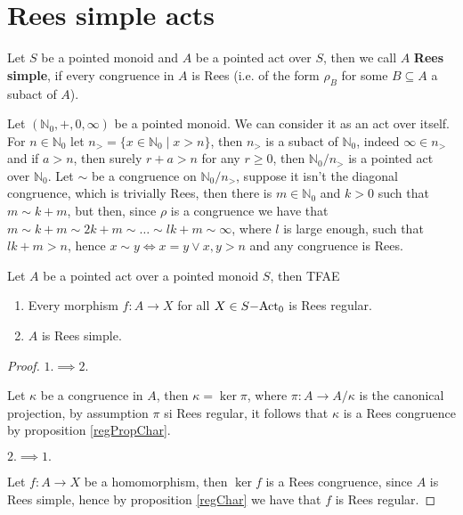 \section{Rees simple acts}
\begin{definition}
    Let $S$ be a pointed monoid and $A$ be a pointed act over $S$, then we call $A$
    \textbf{Rees simple}, if every congruence in $A$ is Rees (i.e. of the form $\rho_B$ for some $B\subseteq A$ a subact of $A$).
\end{definition}
\begin{example}
    Let $(\mathbb{N}_0, +, 0, \infty)$ be a pointed monoid. We can consider it as an act over itself. For $n\in\mathbb{N}_0$ let 
    $n_> = \{x\in\mathbb{N}_0 \mid x > n\}$, then $n_>$ is a subact of $\mathbb{N}_0$, indeed $\infty\in n_>$ and if $a > n$, then 
    surely $r+a > n$ for any $r \geq 0$, then $\mathbb{N}_0/n_>$ is a pointed act over $\mathbb{N}_0$. Let $\sim$ be a congruence on 
    $\mathbb{N}_0/n_>$, suppose it isn't the diagonal congruence, which is trivially Rees, then there is $m\in\mathbb{N}_0$ and $k>0$ such that 
    $m\sim k+m$, but then, since $\rho$ is a congruence we have that $m\sim k+m\sim 2k+m \sim\dots \sim lk+m \sim \infty$, where $l$
    is large enough, such that $lk+m > n$, hence $x\sim y \iff x=y \lor x,y > n$ and any congruence is Rees. 
\end{example}
\begin{proposition}
    Let $A$ be a pointed act over a pointed monoid $S$, then TFAE
    \begin{enumerate}
        \item Every morphism $f: A \to X$ for all $X\in S\mathrm{-Act}_0$ is Rees regular.
        \item $A$ is Rees simple.
    \end{enumerate}
\end{proposition}
\begin{proof}[Proof]
    $1. \implies 2.$\par 
    Let $\kappa$ be a congruence in $A$, then $\kappa=\ker{\pi}$, where $\pi: A \to A/\kappa$ is the canonical projection, by 
    assumption $\pi$ si Rees regular, it follows that $\kappa$ is a Rees congruence by proposition \ref{regPropChar}. \par 
    $2. \implies 1.$\par 
    Let $f: A\to X$ be a homomorphism, then $\ker{f}$ is a Rees congruence, since $A$ is Rees simple, hence by proposition \ref{regChar} 
    we have that $f$ is Rees regular.
\end{proof}
